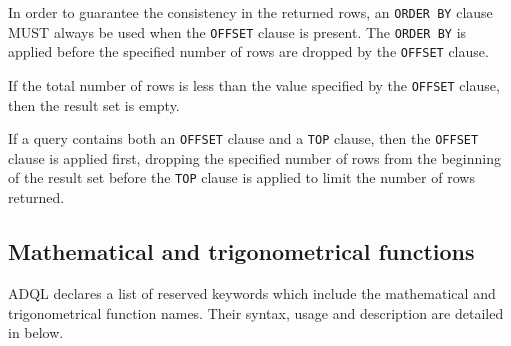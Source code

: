 \documentclass[11pt,a4paper]{ivoa}
\begin{document}
In order to guarantee the consistency in the returned rows, an \texttt{ORDER BY}
clause MUST always be used when the \texttt{OFFSET} clause is present. The
\texttt{ORDER BY} is applied before the specified number of rows are dropped by
the \texttt{OFFSET} clause.
%

If the total number of rows is less than the value
specified by the \texttt{OFFSET} clause, then the result set is empty.

If a query contains both an \texttt{OFFSET} clause and a \texttt{TOP} clause,
then the \texttt{OFFSET} clause is applied first, dropping the specified
number of rows from the beginning of the result set before the
\texttt{TOP} clause is applied to limit the number of rows returned.

\subsection{Mathematical and trigonometrical functions}
\label{sec:math.functions}

ADQL declares a list of reserved keywords  which
include the mathematical and trigonometrical function names. Their syntax,
usage and description are detailed in below.
\end{document}
